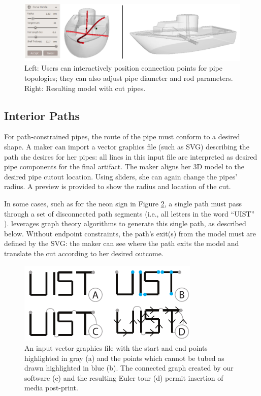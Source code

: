 \begin{figure}[b]
\centering
    \includegraphics[width=1.0\columnwidth]{figures/boat-star.png}
\caption{Left: Users can interactively position connection points for pipe topologies; they can also adjust pipe diameter and rod parameters. Right: Resulting model with cut pipes.}
\label{fig:boat-star}
\end{figure}

\subsection{Interior Paths}

For path-constrained pipes, the route of the pipe must conform to a desired shape. A maker can import a vector graphics file (such as SVG) describing the path she desires for her pipes: all lines in this input file are interpreted as desired pipe components for the final artifact.  The maker aligns her 3D model to the desired pipe cutout location.  Using sliders, she can again change the pipes' radius.  A preview is provided to show the radius and location of the cut.

In some cases, such as for the neon sign in Figure \ref{fig:tool-process-interior}, a single path must pass through a set of disconnected path segments (i.e., all letters in the word ``UIST'' ).  \systemname leverages graph theory algorithms to generate this single path, as described below.  Without endpoint constraints, the path's exit(s) from the model must are defined by the SVG: the maker can see where the path exits the model and translate the cut according to her desired outcome.

\begin{figure}[h!]
\centering
    \includegraphics[width=3.4in]{figures/interior.pdf}
\caption{An input vector graphics file with the start and end points highlighted in {\color{gray}gray} (a) and the points which cannot be tubed as drawn highlighted in {\color{blue}blue} (b).  The connected graph created by our software (c) and the resulting Euler tour (d) permit insertion of media post-print.}
\label{fig:tool-process-interior}
\end{figure}

